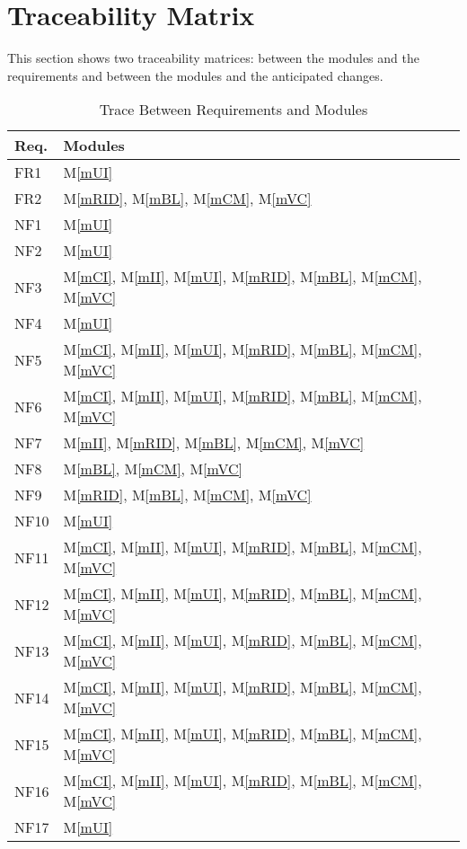 \documentclass[12pt, titlepage]{article}
\newcommand{\mref}[1]{M\ref{#1}}
\begin{document}
\section{Traceability Matrix} \label{SecTM}

This section shows two traceability matrices: between the modules and the
requirements and between the modules and the anticipated changes.

\begin{table}[H]
\centering
\begin{tabular}{p{} p{}}
\toprule
\textbf{Req.} & \textbf{Modules}\\
\midrule
FR1 & \mref{mUI}  \\
FR2 & \mref{mRID}, \mref{mBL}, \mref{mCM}, \mref{mVC}\\
NF1 &  \mref{mUI}  \\
NF2 & \mref{mUI}  \\
NF3 & \mref{mCI}, \mref{mII}, \mref{mUI}, \mref{mRID}, \mref{mBL}, \mref{mCM}, \mref{mVC}\\
NF4 & \mref{mUI}  \\
NF5 & \mref{mCI}, \mref{mII}, \mref{mUI}, \mref{mRID}, \mref{mBL}, \mref{mCM}, \mref{mVC}\\
NF6 & \mref{mCI}, \mref{mII}, \mref{mUI}, \mref{mRID}, \mref{mBL}, \mref{mCM}, \mref{mVC}\\
NF7 & \mref{mII}, \mref{mRID}, \mref{mBL}, \mref{mCM}, \mref{mVC}\\
NF8 & \mref{mBL}, \mref{mCM}, \mref{mVC}\\
NF9 & \mref{mRID}, \mref{mBL}, \mref{mCM}, \mref{mVC}\\
NF10 & \mref{mUI}  \\
NF11 & \mref{mCI}, \mref{mII}, \mref{mUI}, \mref{mRID}, \mref{mBL}, \mref{mCM}, \mref{mVC}\\
NF12 & \mref{mCI}, \mref{mII}, \mref{mUI}, \mref{mRID}, \mref{mBL}, \mref{mCM}, \mref{mVC}\\
NF13 & \mref{mCI}, \mref{mII}, \mref{mUI}, \mref{mRID}, \mref{mBL}, \mref{mCM}, \mref{mVC}\\
NF14 & \mref{mCI}, \mref{mII}, \mref{mUI}, \mref{mRID}, \mref{mBL}, \mref{mCM}, \mref{mVC}\\
NF15 & \mref{mCI}, \mref{mII}, \mref{mUI}, \mref{mRID}, \mref{mBL}, \mref{mCM}, \mref{mVC}\\
NF16 & \mref{mCI}, \mref{mII}, \mref{mUI}, \mref{mRID}, \mref{mBL}, \mref{mCM}, \mref{mVC}\\
NF17 &\mref{mUI}  \\
\bottomrule
\end{tabular}
\caption{Trace Between Requirements and Modules}
\label{TblRT}
\end{table}
\end{document}
